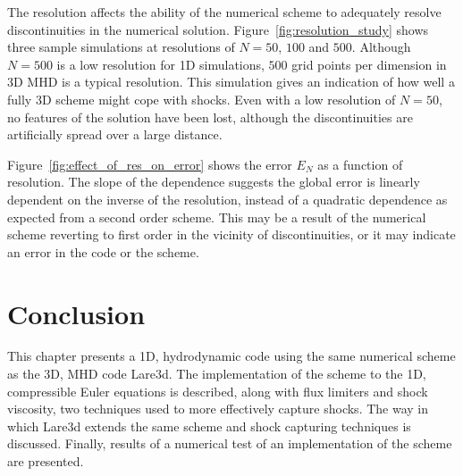 The resolution affects the ability of the numerical scheme to adequately resolve discontinuities in the numerical solution. Figure~\ref{fig:resolution_study} shows three sample simulations at resolutions of $N=50$, $100$ and $500$. Although $N=500$ is a low resolution for 1D simulations, $500$ grid points per dimension in 3D MHD is a typical resolution. This simulation gives an indication of how well a fully 3D scheme might cope with shocks. Even with a low resolution of $N=50$, no features of the solution have been lost, although the discontinuities are artificially spread over a large distance.

Figure~\ref{fig:effect_of_res_on_error} shows the error $E_N$ as a function of resolution. The slope of the dependence suggests the global error is linearly dependent on the inverse of the resolution, instead of a quadratic dependence as expected from a second order scheme. This may be a result of the numerical scheme reverting to first order in the vicinity of discontinuities, or it may indicate an error in the code or the scheme. 

\section{Conclusion}

This chapter presents a 1D, hydrodynamic code using the same numerical scheme as the 3D, MHD code Lare3d. The implementation of the scheme to the 1D, compressible Euler equations is described, along with flux limiters and shock viscosity, two techniques used to more effectively capture shocks. The way in which Lare3d extends the same scheme and shock capturing techniques is discussed. Finally, results of a numerical test of an implementation of the scheme are presented.

